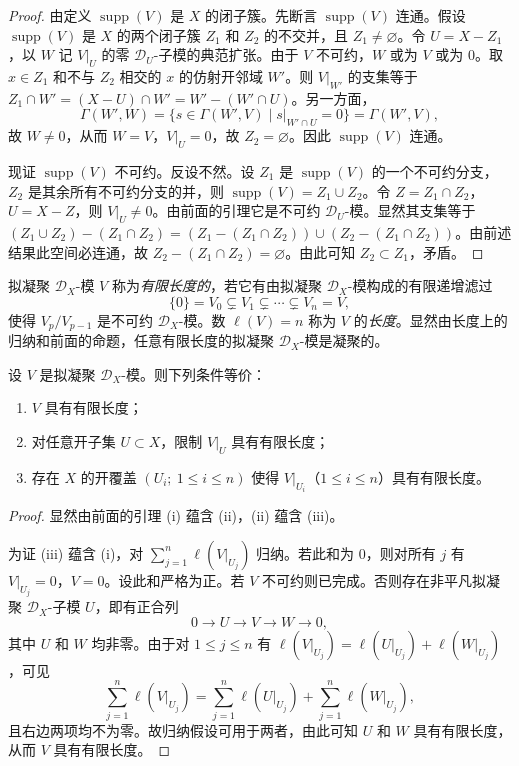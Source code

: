 \begin{proof}
由定义 $\operatorname{supp}(V)$ 是 $X$ 的闭子簇。先断言 $\operatorname{supp}(V)$ 连通。假设 $\operatorname{supp}(V)$ 是 $X$ 的两个闭子簇 $Z_1$ 和 $Z_2$ 的不交并，且 $Z_1\neq\varnothing$。令 $U=X-Z_1$，以 $W$ 记 $V|_U$ 的零 $\mathcal{D}_U$-子模的典范扩张。由于 $V$ 不可约，$W$ 或为 $V$ 或为 $0$。取 $x\in Z_1$ 和不与 $Z_2$ 相交的 $x$ 的仿射开邻域 $W'$。则 $V|_{W'}$ 的支集等于 $Z_1\cap W'=(X-U)\cap W'=W'-(W'\cap U)$。另一方面，
$$\Gamma(W',W)=\{s\in\Gamma(W',V)\mid s|_{W'\cap U}=0\}=\Gamma(W',V),$$
故 $W\neq 0$，从而 $W=V$，$V|_U=0$，故 $Z_2=\varnothing$。因此 $\operatorname{supp}(V)$ 连通。

现证 $\operatorname{supp}(V)$ 不可约。反设不然。设 $Z_1$ 是 $\operatorname{supp}(V)$ 的一个不可约分支，$Z_2$ 是其余所有不可约分支的并，则 $\operatorname{supp}(V)=Z_1\cup Z_2$。令 $Z=Z_1\cap Z_2$，$U=X-Z$，则 $V|_U\neq 0$。由前面的引理它是不可约 $\mathcal{D}_U$-模。显然其支集等于 $(Z_1\cup Z_2)-(Z_1\cap Z_2)=(Z_1-(Z_1\cap Z_2))\cup(Z_2-(Z_1\cap Z_2))$。由前述结果此空间必连通，故 $Z_2-(Z_1\cap Z_2)=\varnothing$。由此可知 $Z_2\subset Z_1$，矛盾。
\end{proof}

拟凝聚 $\mathcal{D}_X$-模 $V$ 称为\emph{有限长度的}，若它有由拟凝聚 $\mathcal{D}_X$-模构成的有限递增滤过
$$\{0\}=V_0\subsetneq V_1\subsetneq\cdots\subsetneq V_n=V,$$
使得 $V_p/V_{p-1}$ 是不可约 $\mathcal{D}_X$-模。数 $\ell(V)=n$ 称为 $V$ 的\emph{长度}。显然由长度上的归纳和前面的命题，任意有限长度的拟凝聚 $\mathcal{D}_X$-模是凝聚的。

\begin{lemma}
设 $V$ 是拟凝聚 $\mathcal{D}_X$-模。则下列条件等价：
\begin{enumerate}[label=(\roman*)]
  \item $V$ 具有有限长度；
  \item 对任意开子集 $U\subset X$，限制 $V|_U$ 具有有限长度；
  \item 存在 $X$ 的开覆盖 $(U_i;\ 1\le i\le n)$ 使得 $V|_{U_i}$（$1\le i\le n$）具有有限长度。
\end{enumerate}
\end{lemma}

\begin{proof}
显然由前面的引理 (i) 蕴含 (ii)，(ii) 蕴含 (iii)。

为证 (iii) 蕴含 (i)，对 $\sum_{j=1}^n\ell(V|_{U_j})$ 归纳。若此和为 $0$，则对所有 $j$ 有 $V|_{U_j}=0$，$V=0$。设此和严格为正。若 $V$ 不可约则已完成。否则存在非平凡拟凝聚 $\mathcal{D}_X$-子模 $U$，即有正合列
$$0\longrightarrow U\longrightarrow V\longrightarrow W\longrightarrow 0,$$
其中 $U$ 和 $W$ 均非零。由于对 $1\le j\le n$ 有 $\ell(V|_{U_j})=\ell(U|_{U_j})+\ell(W|_{U_j})$，可见
$$\sum_{j=1}^n\ell(V|_{U_j})=\sum_{j=1}^n\ell(U|_{U_j})+\sum_{j=1}^n\ell(W|_{U_j}),$$
且右边两项均不为零。故归纳假设可用于两者，由此可知 $U$ 和 $W$ 具有有限长度，从而 $V$ 具有有限长度。
\end{proof}

